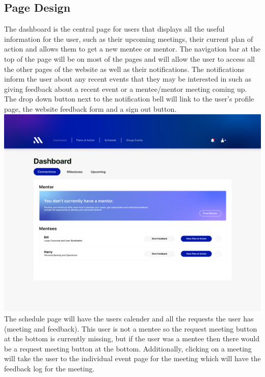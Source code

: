 \documentclass[10pt]{article}
\begin{document}
\subsection{Page Design}
The dashboard is the central page for users that displays all the useful
information for the user, such as their upcoming meetings, their current plan of
action and allows them to get a new mentee or mentor. The navigation bar at the
top of the page will be on most of the pages and will allow the user to access
all the other pages of the website as well as their notifications. The
notifications inform the user about any recent events that they may be
interested in such as giving feedback about a recent event or a mentee/mentor
meeting coming up. The drop down button next to the notification bell will link
to the user’s profile page, the website feedback form and a sign out button.
\\
\includegraphics[scale=0.8]{Dashboard}
\\
The schedule page will have the users calender and all the requests the user has
(meeting and feedback). This user is not a mentee so the request meeting button
at the bottom is currently missing, but if the user was a mentee then there
would be a request meeting button at the bottom. Additionally, clicking on a
meeting will take the user to the individual event page for the meeting which
will have the feedback log for the meeting.
\\
\end{document}
